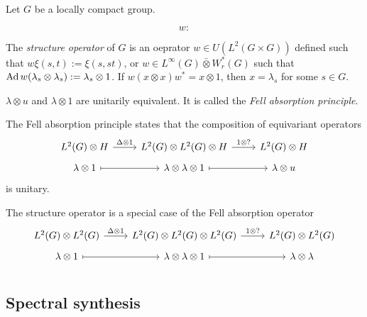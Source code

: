 \documentclass{../../large}
\begin{document}
\begin{prb}
Let $G$ be a locally compact group.

\[w:\]


The \emph{structure operator} of $G$
 is an oeprator $w\in U(L^2(G\times G))$ defined such that $w\xi(s,t):=\xi(s,st)$, or $w\in L^\infty(G)\bar\otimes W_r^*(G)$ such that $\operatorname{Ad} w(\lambda_s\otimes\lambda_s):=\lambda_s\otimes1$.
If $w(x\otimes x)w^*=x\otimes1$, then $x=\lambda_s$ for some $s\in G$.
\begin{parts}
\item $\lambda\otimes u$ and $\lambda\otimes1$ are unitarily equivalent. It is called the \emph{Fell absorption principle}.
\end{parts}
\end{prb}
\begin{pf}

The Fell absorption principle states that the composition of equivariant operators
\[\begin{tikzcd}[row sep=tiny]
L^2(G)\otimes H \rar{\Delta\otimes1} & L^2(G)\otimes L^2(G)\otimes H \rar{1\otimes?} & L^2(G)\otimes H\\
\lambda\otimes 1 \rar[mapsto] & \lambda\otimes\lambda\otimes1 \rar[mapsto] & \lambda\otimes u
\end{tikzcd}\]
is unitary.

The structure operator is a special case of the Fell absorption operator
\[\begin{tikzcd}[row sep=tiny]
L^2(G)\otimes L^2(G) \rar{\Delta\otimes1} & L^2(G)\otimes L^2(G)\otimes L^2(G) \rar{1\otimes?} & L^2(G)\otimes L^2(G)\\
\lambda\otimes1 \rar[mapsto] & \lambda\otimes\lambda\otimes1 \rar[mapsto] & \lambda\otimes\lambda
\end{tikzcd}\]
\end{pf}



\chapter{}


\section{Spectral synthesis}


\chapter{}
\end{document}
